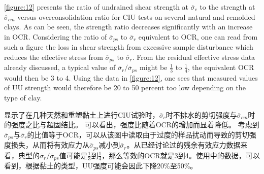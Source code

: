 \begin{paracol}{2}
    \switchcolumn*

    \autoref{figure:12} presents the ratio of undrained shear strength at $\overline{\sigma}_c$ to the strength at $\overline{\sigma}_{cm}$ versus overconsolidation ratio for CIU tests on several natural and remolded clays. As can be seen, the strength ratio decreases significantly with an increase in OCR. Considering the ratio of $\overline{\sigma}_{ps}$ to $\overline{\sigma}_r$ equivalent to OCR, one can read from such a figure the loss in shear strength from excessive sample disturbance which reduces the effective stress from $\overline{\sigma}_{ps}$ to $\overline{\sigma}_r$. From the residual effective stress data already discussed, a typical value of $\overline{\sigma}_r/\overline{\sigma}_{ps}$ might be $\frac{1}{3}$ to $\frac{1}{4}$, the equivalent OCR would then be 3 to 4. Using the data in \autoref{figure:12}, one sees that measured values of UU strength would therefore be 20 to 50 percent too low depending on the type of clay.

    \switchcolumn

    显示了在几种天然和重塑黏土上进行CIU试验时，$\overline{\sigma}_c$时不排水的剪切强度与$\overline{\sigma}_{cm}$时的强度之比与超固结比。 可以看出，强度比随着OCR的增加而显着降低。 考虑到$\overline{\sigma}_{ps}$与$\overline{\sigma}_r$的比值等于OCR，可以从该图中读取由于过度的样品扰动而导致的剪切强度损失，从而将有效应力从$\overline{\sigma}_{ps}$减小到$\overline{\sigma}_r$。从已经讨论过的残余有效应力数据来看，典型的$\overline{\sigma}_r/\overline{\sigma}_{ps}$值可能是$\frac{1}{3}$到$\frac{1}{4}$，那么等效的OCR就是3到4。使用中的数据，可以看到，根据黏土的类型，UU强度可能会因此下降20$\%$至50$\%$。

\end{paracol}



